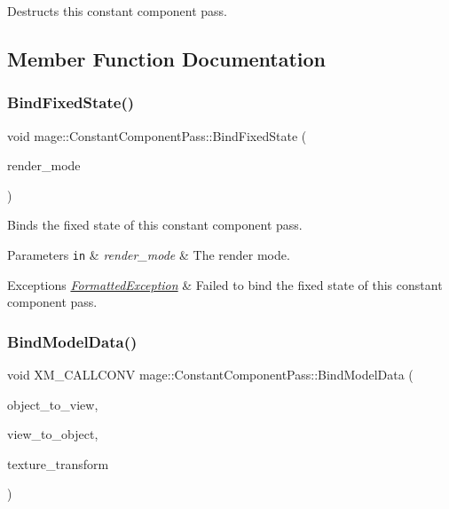 Destructs this constant component pass. 

\subsection{Member Function Documentation}
\hypertarget{classmage_1_1_constant_component_pass_a87e9d62d5d93b1a66388ab0ccd494e8b}{}\label{classmage_1_1_constant_component_pass_a87e9d62d5d93b1a66388ab0ccd494e8b} 
\subsubsection{\texorpdfstring{Bind\+Fixed\+State()}{BindFixedState()}}
{\footnotesize\ttfamily void mage\+::\+Constant\+Component\+Pass\+::\+Bind\+Fixed\+State (\begin{DoxyParamCaption}\item[{\hyperlink{namespacemage_a5e7e18b0154373ce8fc942fe3f6b27fd}{Render\+Mode}}]{render\+\_\+mode }\end{DoxyParamCaption})}

Binds the fixed state of this constant component pass.


\begin{DoxyParams}[1]{Parameters}
\mbox{\tt in}  & {\em render\+\_\+mode} & The render mode. \\
\hline
\end{DoxyParams}

\begin{DoxyExceptions}{Exceptions}
{\em \hyperlink{structmage_1_1_formatted_exception}{Formatted\+Exception}} & Failed to bind the fixed state of this constant component pass. \\
\hline
\end{DoxyExceptions}
\hypertarget{classmage_1_1_constant_component_pass_a196372d184f74c8f268adc1e7865ef17}{}\label{classmage_1_1_constant_component_pass_a196372d184f74c8f268adc1e7865ef17} 
\subsubsection{\texorpdfstring{Bind\+Model\+Data()}{BindModelData()}}
{\footnotesize\ttfamily void X\+M\+\_\+\+C\+A\+L\+L\+C\+O\+NV mage\+::\+Constant\+Component\+Pass\+::\+Bind\+Model\+Data (\begin{DoxyParamCaption}\item[{F\+X\+M\+M\+A\+T\+R\+IX}]{object\+\_\+to\+\_\+view,  }\item[{C\+X\+M\+M\+A\+T\+R\+IX}]{view\+\_\+to\+\_\+object,  }\item[{C\+X\+M\+M\+A\+T\+R\+IX}]{texture\+\_\+transform }\end{DoxyParamCaption})\hspace{0.3cm}{\ttfamily [private]}}

